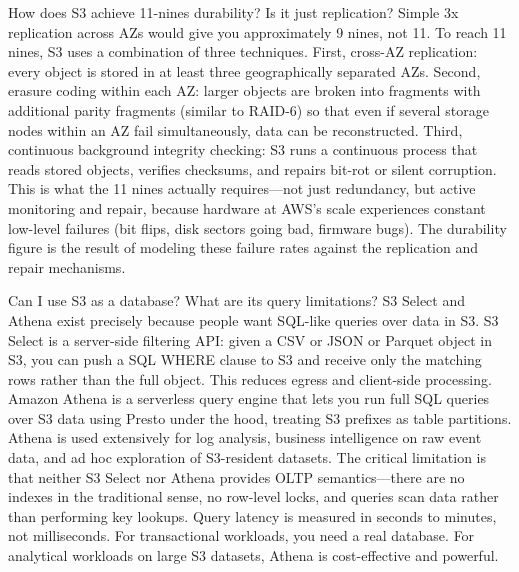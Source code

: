 \documentclass[11pt,a4paper]{article}
\begin{document}
\begin{curiobox}{How does S3 achieve 11-nines durability? Is it just replication?}
Simple 3x replication across AZs would give you approximately 9 nines, not 11. To reach 11 nines, S3 uses a combination of three techniques. First, cross-AZ replication: every object is stored in at least three geographically separated AZs. Second, erasure coding within each AZ: larger objects are broken into fragments with additional parity fragments (similar to RAID-6) so that even if several storage nodes within an AZ fail simultaneously, data can be reconstructed. Third, continuous background integrity checking: S3 runs a continuous process that reads stored objects, verifies checksums, and repairs bit-rot or silent corruption. This is what the 11 nines actually requires---not just redundancy, but active monitoring and repair, because hardware at AWS's scale experiences constant low-level failures (bit flips, disk sectors going bad, firmware bugs). The durability figure is the result of modeling these failure rates against the replication and repair mechanisms.
\end{curiobox}

\begin{curiobox}{Can I use S3 as a database? What are its query limitations?}
S3 Select and Athena exist precisely because people want SQL-like queries over data in S3. S3 Select is a server-side filtering API: given a CSV or JSON or Parquet object in S3, you can push a SQL WHERE clause to S3 and receive only the matching rows rather than the full object. This reduces egress and client-side processing. Amazon Athena is a serverless query engine that lets you run full SQL queries over S3 data using Presto under the hood, treating S3 prefixes as table partitions. Athena is used extensively for log analysis, business intelligence on raw event data, and ad hoc exploration of S3-resident datasets. The critical limitation is that neither S3 Select nor Athena provides OLTP semantics---there are no indexes in the traditional sense, no row-level locks, and queries scan data rather than performing key lookups. Query latency is measured in seconds to minutes, not milliseconds. For transactional workloads, you need a real database. For analytical workloads on large S3 datasets, Athena is cost-effective and powerful.
\end{curiobox}
\end{document}
